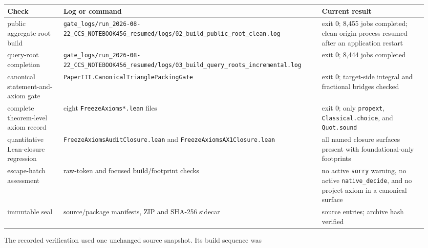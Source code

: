 \documentclass[english,11pt,a4paper]{article}
\newcounter{none}
\begin{document}
{\def\LTcaptype{none} %
\begin{longtable}[]{@{}
  >{\raggedright\arraybackslash}p{}
  >{\raggedright\arraybackslash}p{}
  >{\raggedright\arraybackslash}p{}@{}}
\toprule\noalign{}
\begin{minipage}[b]{\linewidth}\raggedright
Check
\end{minipage} & \begin{minipage}[b]{\linewidth}\raggedright
Log or command
\end{minipage} & \begin{minipage}[b]{\linewidth}\raggedright
Current result
\end{minipage} \\
\midrule\noalign{}
\endhead
\bottomrule\noalign{}
\endlastfoot
public aggregate-root build &
\nolinkurl{gate_logs/run_2026-08-22_CCS_NOTEBOOK456_resumed/logs/02_build_public_root_clean.log}
& exit 0; 8,455 jobs completed; clean-origin process resumed after an
application restart \\
query-root completion &
\nolinkurl{gate_logs/run_2026-08-22_CCS_NOTEBOOK456_resumed/logs/03_build_query_roots_incremental.log}
& exit 0; 8,444 jobs completed \\
canonical statement-and-axiom gate &
\nolinkurl{PaperIII.CanonicalTrianglePackingGate} & exit 0; target-side
integral and fractional bridges checked \\
complete theorem-level axiom record & eight \nolinkurl{FreezeAxioms*.lean}
files & exit 0; only \nolinkurl{propext}, \nolinkurl{Classical.choice}, and
\nolinkurl{Quot.sound} \\
quantitative Lean-closure regression &
\nolinkurl{FreezeAxiomsAuditClosure.lean} and
\nolinkurl{FreezeAxiomsAX1Closure.lean} & all named closure surfaces
present with foundational-only footprints \\
escape-hatch assessment & raw-token and focused build/footprint checks &
no active \nolinkurl{sorry} warning, no active \nolinkurl{native_decide}, and
no project axiom in a canonical surface \\
immutable seal & source/package manifests, ZIP and SHA-256 sidecar & 707
source entries; archive hash verified \\
\end{longtable}
}

The recorded verification used one unchanged source snapshot. Its build
sequence was
\end{document}
